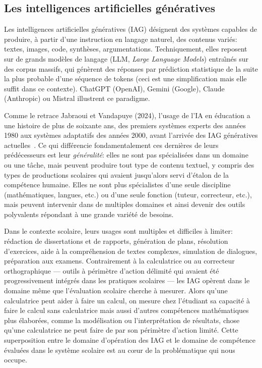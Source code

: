 \subsection{Les intelligences artificielles g\'en\'eratives}

Les intelligences artificielles g\'en\'eratives (IAG) d\'esignent des syst\`emes capables de produire, \`a partir d'une instruction en langage naturel, des contenus vari\'es: textes, images, code, synth\`eses, argumentations. 
Techniquement, elles reposent sur de grands mod\`eles de langage (LLM, \emph{Large Language Models}) entra\^\i n\'es sur des corpus massifs, qui g\'en\`erent des r\'eponses par pr\'ediction statistique de la suite la plus probable d'une s\'equence de tokens (ceci est une simplification mais elle suffit dans ce contexte). 
ChatGPT (OpenAI), Gemini (Google), Claude (Anthropic) ou Mistral illustrent ce paradigme.

Comme le retrace Jabraoui et Vandapuye (2024), l'usage de l'IA en \'education a une histoire de plus de soixante ans, des premiers syst\`emes experts des ann\'ees 1980 aux syst\`emes adaptatifs des ann\'ees 2000, avant l'arriv\'ee des IAG g\'en\'eratives actuelles~\cite{jabraoui2024}.
Ce qui diff\'erencie fondamentalement ces derni\`eres de leurs pr\'ed\'ecesseurs est leur \emph{g\'en\'eralit\'e}: elles ne sont pas sp\'ecialis\'ees dans un domaine ou une t\^ache, mais peuvent produire tout type de contenu textuel, y compris des types de productions scolaires qui avaient jusqu'alors servi d'\'etalon de la comp\'etence humaine.
Elles ne sont plus spécialistes d'une seule discipline (math\'ematiques, langues, etc.) ou d'une seule fonction (tuteur, correcteur, etc.), mais peuvent intervenir dans de multiples domaines et ainsi devenir des outils polyvalents répondant à une grande variété de besoins.

Dans le contexte scolaire, leurs usages sont multiples et difficiles \`a limiter: r\'edaction de dissertations et de rapports, g\'en\'eration de plans, r\'esolution d'exercices, aide \`a la compr\'ehension de textes complexes, simulation de dialogues, pr\'eparation aux examens. 
Contrairement \`a la calculatrice ou au correcteur orthographique --- outils \`a p\'erim\`etre d'action d\'elimit\'e qui avaient \'et\'e progressivement int\'egr\'es dans les pratiques scolaires --- les IAG op\`erent dans le domaine m\^eme que l'\'evaluation scolaire cherche \`a mesurer. 
Alors qu'une calculatrice peut aider \`a faire un calcul, on mesure chez l'\'etudiant sa capacit\'e \`a faire le calcul sans calculatrice mais aussi d'autres compétences math\'ematiques plus \'elabor\'ees, comme la mod\'elisation ou l'interpr\'etation de r\'esultats, chose qu'une calculatrice ne peut faire de par son p\'erim\`etre d'action limit\'e.
Cette superposition entre le domaine d'opération des IAG et le domaine de compétence évaluées dans le système scolaire est au c\oe{}ur de la probl\'ematique qui nous occupe.


